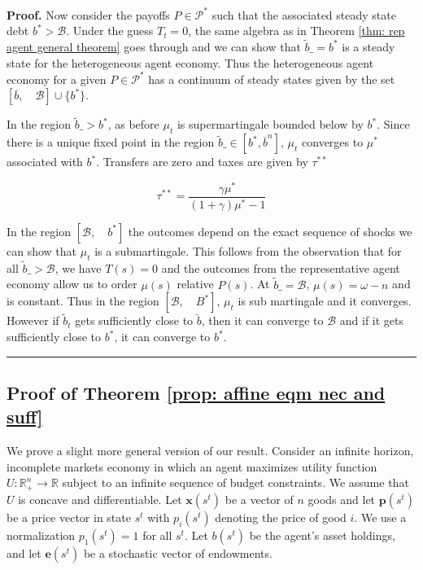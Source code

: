 \documentclass[thmsb,11pt]{article}
\newenvironment{proof}[1][Proof]{\noindent \textbf{#1.} }{\  \rule{0.5em}{0.5em}}
\begin{document}
\begin{proof}
Now consider the payoffs $P\in \mathcal {P}^*$ such that the associated steady state debt $b^*>\mathcal{B}$. Under the guess $T_t=0$, the same algebra as in Theorem \ref{thm: rep agent general theorem} goes through and we can show that $\tilde b\_=b^*$ is a steady state for the heterogeneous agent economy. Thus the heterogeneous agent economy for a given $P\in \mathcal{P}^*$ has a continuum of steady states given by the set $[\overline b, \quad \mathcal{B}] \cup \{b^*\}$.



In the region $\tilde b\_>b^*$, as before $\mu_t$ is supermartingale bounded below by $b^*$. Since there is a unique fixed point in the region $\tilde b\_ \in [b^*, \overline b^{n}]$, $\mu_t$ converges to $\mu^*$ associated with $b^*$. Transfers are zero and taxes are given by $\tau^{**}$


\begin{equation}
\tau^{**} = \frac{\gamma\mu^*}{(1+\gamma)\mu^*-1}
\end{equation}



In the region $[\mathcal{B},\quad b^*]$ the outcomes depend on the exact sequence of shocks we can show that $\mu_t$ is a submartingale. This follows from the observation that for all $\tilde b\_> \mathcal{B}$, we have $T(s)=0$ and the outcomes from the representative agent economy allow us to order $\mu(s)$ relative $P(s)$. At $\tilde{b}\_=\mathcal{B}$, $\mu(s)=\omega-n$ and is constant. Thus in the region $[\mathcal{B},\quad B^*]$, $\mu_t$ is sub martingale and it converges. However if $\tilde b_t$ gets sufficiently close to $\check b$, then it can converge to $\mathcal{B}$ and if it gets sufficiently close to $b^*$, it can converge to $b^*$.
\end{proof}


\newpage

\subsection{Proof of Theorem \ref{prop: affine eqm nec and suff}}
\label{appndx: affine eqm nec and stuff}
\smallskip

We prove a slight more general version of our result. Consider an infinite
horizon, incomplete markets economy in which an agent maximizes utility
function $U:\mathbb{R}_{+}^{n}\rightarrow \mathbb{R}$ subject to an infinite
sequence of budget constraints. We assume that $U$ is concave and
differentiable. Let $\mathbf{x}(s^t)$ be a vector of $n$ goods and let $%
\mathbf{p}(s^{t})$ be a price vector in state $s^{t}$ with $p_{i}(s^{t})$
denoting the price of good $i.$ We use a normalization $p_{1}\left(
s^{t}\right) =1$ for all $s^{t}.$
Let $b(s^{t})$ be the agent's asset holdings, and let $\mathbf{e}\left(
s^{t}\right) $ be a stochastic vector of endowments.
\end{document}
